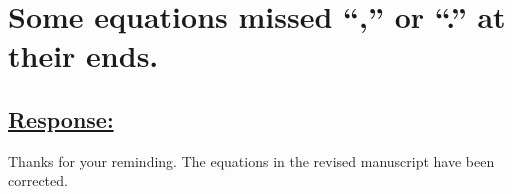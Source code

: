 \section{Some equations missed ``,'' or ``.'' at their ends.}
\subsection*{\underline{\textbf{Response:}}}

Thanks for your reminding.
The equations in the revised manuscript have been corrected.


